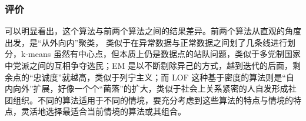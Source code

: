 \documentclass[UTF8]{ctexart}
\begin{document}
        \subsubsection{评价}
            可以明显看出，这个算法与前两个算法之间的结果差异。前两个算法从直观的角度出发，是“从外向内”聚类， 类似于在异常数据与正常数据之间划了几条线进行划分，k-means 虽然有中心点，但本质上仍是数据点的站队问题，类似于多党制国家中党派之间的互相争夺选民；EM 是以不断剔除异己的方式，越到迭代的后面，剩余点的“忠诚度”就越高，类似于列宁主义；而 LOF 这种基于密度的算法则是“自内向外”扩展，好像一个个“菌落”的扩大，类似于社会上关系紧密的人自发形成社团组织。不同的算法适用于不同的情境，要充分考虑到这些算法的特点与情境的特点，灵活地选择最适合当前情境的算法或其组合。


        


\end{document}
